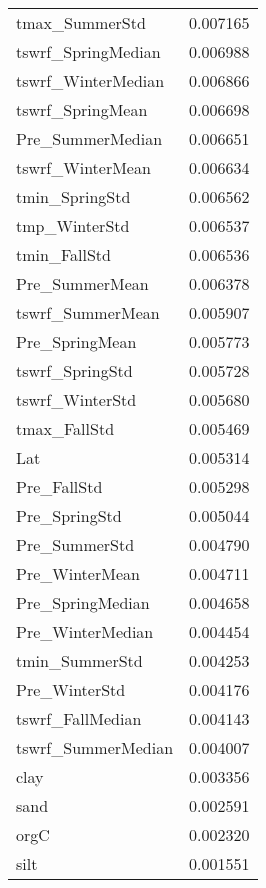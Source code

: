 \begin{tabular}{lr}
tmax_SummerStd & 0.007165 \\
tswrf_SpringMedian & 0.006988 \\
tswrf_WinterMedian & 0.006866 \\
tswrf_SpringMean & 0.006698 \\
Pre_SummerMedian & 0.006651 \\
tswrf_WinterMean & 0.006634 \\
tmin_SpringStd & 0.006562 \\
tmp_WinterStd & 0.006537 \\
tmin_FallStd & 0.006536 \\
Pre_SummerMean & 0.006378 \\
tswrf_SummerMean & 0.005907 \\
Pre_SpringMean & 0.005773 \\
tswrf_SpringStd & 0.005728 \\
tswrf_WinterStd & 0.005680 \\
tmax_FallStd & 0.005469 \\
Lat & 0.005314 \\
Pre_FallStd & 0.005298 \\
Pre_SpringStd & 0.005044 \\
Pre_SummerStd & 0.004790 \\
Pre_WinterMean & 0.004711 \\
Pre_SpringMedian & 0.004658 \\
Pre_WinterMedian & 0.004454 \\
tmin_SummerStd & 0.004253 \\
Pre_WinterStd & 0.004176 \\
tswrf_FallMedian & 0.004143 \\
tswrf_SummerMedian & 0.004007 \\
clay & 0.003356 \\
sand & 0.002591 \\
orgC & 0.002320 \\
silt & 0.001551 \\
\bottomrule
\end{tabular}
